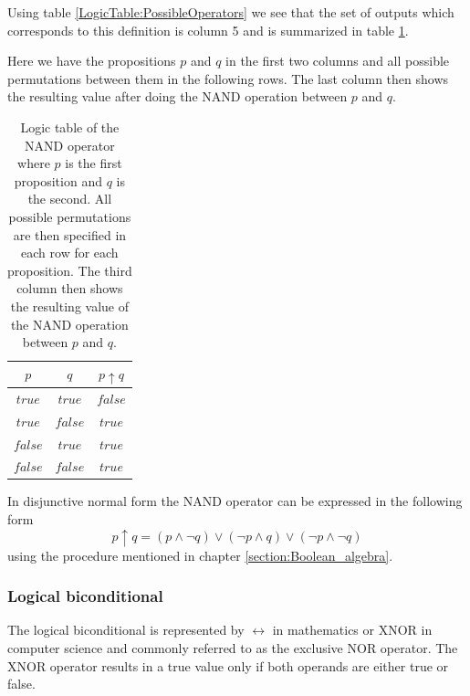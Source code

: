         Using table \ref{LogicTable:PossibleOperators} we see that the set of outputs which corresponds to this definition is column 5 and is summarized in table \ref{LogicTable:NAND}.
        
        Here we have the propositions $p$ and $q$ in the first two columns and all possible permutations between them in the following rows. The last column then shows the resulting value after doing the NAND operation between $p$ and $q$.
        
        \begin{table}[h!]
            \centering
            \begin{tabular}{|c|c|c|}
            	\hline
            	  $p$   &   $q$   & $p \uparrow q$ \\ \hline
            	$true$  & $true$  &    $false$     \\ \hline
            	$true$  & $false$ &     $true$     \\ \hline
            	$false$ & $true$  &     $true$     \\ \hline
            	$false$ & $false$ &     $true$     \\ \hline
            \end{tabular}
            \caption{Logic table of the NAND operator where $p$ is the first proposition and $q$ is the second. All possible permutations are then specified in each row for each proposition. The third column then shows the resulting value of the NAND operation between $p$ and $q$.}
            \label{LogicTable:NAND}
        \end{table}
        
        In disjunctive normal form the NAND operator can be expressed in the following form
        \begin{equation}
            p \uparrow q = (p \wedge \neg q) \vee (\neg p \wedge q) \vee (\neg p \wedge \neg q)
        \end{equation}
        using the procedure mentioned in chapter \ref{section:Boolean_algebra}.
    
    \subsubsection{Logical biconditional}
        The logical biconditional is represented by $\leftrightarrow$ in mathematics or XNOR in computer science and commonly referred to as the exclusive NOR operator. The XNOR operator results in a true value only if both operands are either true or false.
        
